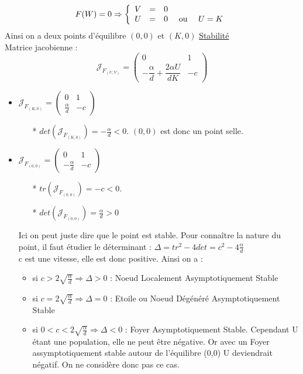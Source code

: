 \documentclass[a4paper,11pt]{article}
\begin{document}
\[
F(W)=0 \Rightarrow
\left\{
\begin{array}{r c l}
V &=& 0\\
U &=& 0 \quad \text{  ou } \quad U = K
\end{array}
\right.
\]
Ainsi on a deux points d'équilibre $(0,0)$ et $(K,0)$
\newline
\newline
\underline{Stabilité}\\
Matrice jacobienne : $$\mathcal{J}_{F_{(U,V)}}=\begin{pmatrix} 0 & 1 \\ -\dfrac{\alpha}{d}+ \dfrac{2 \alpha U }{d K} & -c\end{pmatrix}$$
\newline
\begin{itemize}[label=$\bullet$]
	\item$\mathcal{J}_{F_{(K,0)}}=\begin{pmatrix} 0 & 1 \\ \frac{\alpha}{d} & -c \end{pmatrix}$\\
    \begin{itemize}
		\item[*] $det (\mathcal{J}_{F_{(K,0)}}) = - \frac{\alpha}{d} <0$. $(0,0)$ est donc un point selle.
	\end{itemize}
    \item $\mathcal{J}_{F_{(0,0)}}=\begin{pmatrix} 0 & 1 \\ - \frac{\alpha}{d} & -c \end{pmatrix}$\\
    \begin{itemize}
		\item[*] $tr (\mathcal{J}_{F_{(0,0)}})= -c <0$. 
        \item[*] $det (\mathcal{J}_{F_{(0,0)}}) = \frac{\alpha}{d}>0 $\\
    \end{itemize}
\noindent Ici on peut juste dire que le point est stable.
Pour connaître la nature du point, il faut étudier le déterminant : $\Delta = tr^2 -4 det= c^2-4 \frac{\alpha}{d}$\\
            c est une vitesse, elle est donc positive. Ainsi on a :
      	\begin{itemize}[label=$\rightarrow$]
			\item si $c>2\sqrt{\frac{\alpha}{d}} \Rightarrow \Delta >0$ : Noeud Localement Asymptotiquement Stable
            \item si $c=2\sqrt{\frac{\alpha}{d}} \Rightarrow \Delta =0$ : Etoile ou Noeud Dégénéré Asymptotiquement Stable
            \item si $0<c<2\sqrt{\frac{\alpha}{d}} \Rightarrow \Delta <0$ : Foyer Asymptotiquement Stable. Cependant U étant une population, elle ne peut être négative. Or avec un Foyer assymptotiquement stable autour de l'équilibre (0,0) U deviendrait négatif. On ne considère donc pas ce cas.
		\end{itemize}
\end{itemize}
\end{document}
